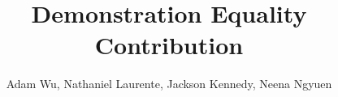 \documentclass{article}
\begin{document}
\title{Demonstration Equality Contribution}
\author{Adam Wu, Nathaniel Laurente, Jackson Kennedy, Neena Ngyuen}
\maketitle










\end{document}
